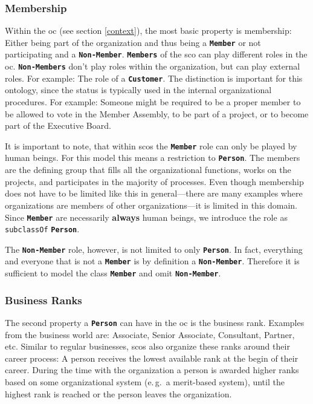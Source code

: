 \documentclass[a4paper, DIV=13, BCOR=0cm]{scrbook}
\newcommand{\eg}{e.\,g.\ }
\newcommand{\class}[1]{\texttt{\textbf{#1}}}
\newcommand{\relation}[1]{\texttt{#1}}
\begin{document}
\subsubsection{Membership}
\label{membership}
Within the \gls{oc} (see section \ref{context}), the most basic property is membership: Either being part of the organization and thus being a \class{Member} or not participating and a \class{Non-Member}. \class{Members} of the \gls{sco} can play different roles in the \gls{oc}. \class{Non-Members} don't play roles within the organization, but can play external roles. For example: The role of a \class{Customer}. The distinction is important for this ontology, since the status is typically used in the internal organizational procedures. For example: Someone might be required to be a proper member to be allowed to vote in the Member Assembly, to be part of a project, or to become part of the Executive Board.

It is important to note, that within \glspl{sco} the \class{Member} role can only be played by human beings. For this model this means a restriction to \class{Person}. The members are the defining group that fills all the organizational functions, works on the projects, and participates in the majority of processes. Even though membership does not have to be limited like this in general---there are many examples where organizations are members of other organizations---it is limited in this domain. Since \class{Member} are necessarily \textbf{always} human beings, we introduce the role as \relation{subclassOf} \class{Person}.

The \class{Non-Member} role, however, is not limited to only \class{Person}. In fact, everything and everyone that is not a \class{Member} is by definition a \class{Non-Member}. Therefore it is sufficient to model the class \class{Member} and omit \class{Non-Member}.

\subsubsection{Business Ranks}
\label{ranks}
The second property a \class{Person} can have in the \gls{oc} is the business rank. Examples from the business world are: Associate, Senior Associate, Consultant, Partner, etc. Similar to regular businesses, \glspl{sco} also organize these ranks around their career process: A person receives the lowest available rank at the begin of their career. During the time with the organization a person is awarded higher ranks based on some organizational system (\eg a merit-based system), until the highest rank is reached or the person leaves the organization.
\end{document}
